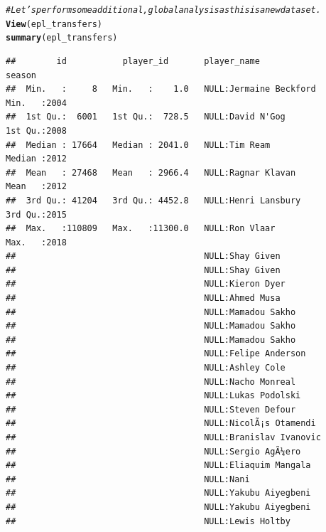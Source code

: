 \documentclass{article}\usepackage[]{graphicx}\usepackage[]{color}
\makeatletter
\newcommand{\hlcom}[1]{\textcolor[rgb]{0.678,0.584,0.686}{\textit{#1}}}%
\newcommand{\hlstd}[1]{\textcolor[rgb]{0.345,0.345,0.345}{#1}}%
\newcommand{\hlkwd}[1]{\textcolor[rgb]{0.737,0.353,0.396}{\textbf{#1}}}%
\newenvironment{kframe}{%
 \def\at@end@of@kframe{}%
 \ifinner\ifhmode%
  \def\at@end@of@kframe{\end{minipage}}%
  \begin{minipage}{\columnwidth}%
 \fi\fi%
 \def\FrameCommand##1{\hskip\@totalleftmargin \hskip-\fboxsep
 \colorbox{shadecolor}{##1}\hskip-\fboxsep
     \hskip-\linewidth \hskip-\@totalleftmargin \hskip\columnwidth}%
 \MakeFramed {\advance\hsize-\width
   \@totalleftmargin\z@ \linewidth\hsize
   \@setminipage}}%
 {\par\unskip\endMakeFramed%
 \at@end@of@kframe}
\newenvironment{knitrout}{}{} %
\makeatother
\begin{document}
\begin{knitrout}
\begin{kframe}
\begin{alltt}
\hlcom{# Let's perform some additional, global analysis as this is a new dataset.}
\hlkwd{View}\hlstd{(epl_transfers)}
\hlkwd{summary}\hlstd{(epl_transfers)}
\end{alltt}
\begin{verbatim}
##        id           player_id       player_name                          season    
##  Min.   :     8   Min.   :    1.0   NULL:Jermaine Beckford           Min.   :2004  
##  1st Qu.:  6001   1st Qu.:  728.5   NULL:David N'Gog                 1st Qu.:2008  
##  Median : 17664   Median : 2041.0   NULL:Tim Ream                    Median :2012  
##  Mean   : 27468   Mean   : 2966.4   NULL:Ragnar Klavan               Mean   :2012  
##  3rd Qu.: 41204   3rd Qu.: 4452.8   NULL:Henri Lansbury              3rd Qu.:2015  
##  Max.   :110809   Max.   :11300.0   NULL:Ron Vlaar                   Max.   :2018  
##                                     NULL:Shay Given                                
##                                     NULL:Shay Given                                
##                                     NULL:Kieron Dyer                               
##                                     NULL:Ahmed Musa                                
##                                     NULL:Mamadou Sakho                             
##                                     NULL:Mamadou Sakho                             
##                                     NULL:Mamadou Sakho                             
##                                     NULL:Felipe Anderson                           
##                                     NULL:Ashley Cole                               
##                                     NULL:Nacho Monreal                             
##                                     NULL:Lukas Podolski                            
##                                     NULL:Steven Defour                             
##                                     NULL:NicolÃ¡s Otamendi                         
##                                     NULL:Branislav Ivanovic                        
##                                     NULL:Sergio AgÃ¼ero                            
##                                     NULL:Eliaquim Mangala                          
##                                     NULL:Nani                                      
##                                     NULL:Yakubu Aiyegbeni                          
##                                     NULL:Yakubu Aiyegbeni                          
##                                     NULL:Lewis Holtby                              

\end{verbatim}
\end{kframe}
\end{knitrout}
\end{document}
